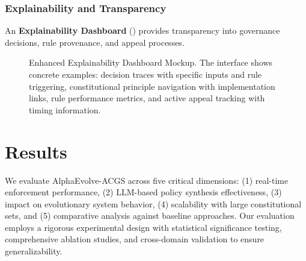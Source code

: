 \documentclass[sigconf,natbib]{acmart}
\begin{document}
\subsubsection{Explainability and Transparency}
An \textbf{Explainability Dashboard} () provides transparency into governance decisions, rule provenance, and appeal processes.

\begin{figure}[htbp]
  \centering
  \caption[Enhanced explainability dashboard mockup]{Enhanced Explainability Dashboard Mockup. The interface shows concrete examples: decision traces with specific inputs and rule triggering, constitutional principle navigation with implementation links, rule performance metrics, and active appeal tracking with timing information.}
  \label{fig:explainability_dashboard}
\end{figure}



\section{Results}
\label{sec:results}
We evaluate AlphaEvolve-ACGS across five critical dimensions: (1) real-time enforcement performance, (2) LLM-based policy synthesis effectiveness, (3) impact on evolutionary system behavior, (4) scalability with large constitutional sets, and (5) comparative analysis against baseline approaches. Our evaluation employs a rigorous experimental design with statistical significance testing, comprehensive ablation studies, and cross-domain validation to ensure generalizability.
\end{document}

